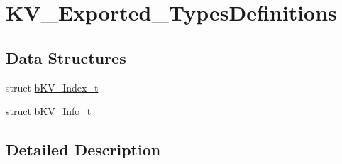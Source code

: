 \hypertarget{group___k_v___exported___types_definitions}{}\section{K\+V\+\_\+\+Exported\+\_\+\+Types\+Definitions}
\label{group___k_v___exported___types_definitions}
\subsection*{Data Structures}
\begin{DoxyCompactItemize}
\item 
struct \mbox{\hyperlink{structb_k_v___index__t}{b\+K\+V\+\_\+\+Index\+\_\+t}}
\item 
struct \mbox{\hyperlink{structb_k_v___info__t}{b\+K\+V\+\_\+\+Info\+\_\+t}}
\end{DoxyCompactItemize}


\subsection{Detailed Description}
